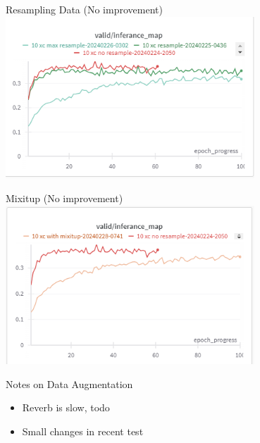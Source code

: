 \begin{frame}{Resampling Data (No improvement)}
    \centering
    \includegraphics[height=0.7\textheight,width=0.7\textwidth,keepaspectratio]{images/resample.png}
\end{frame}

\begin{frame}{Mixitup (No improvement)}
    \centering
    \includegraphics[height=0.7\textheight,width=0.7\textwidth,keepaspectratio]{images/mixitup.png}
\end{frame}

\begin{frame}{Notes on Data Augmentation}
    \centering
    \begin{itemize}
        \item Reverb is slow, todo
        \item Small changes in recent test
    \end{itemize}
\end{frame}

